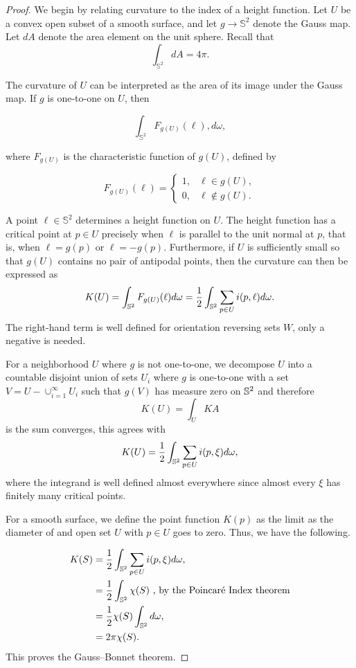 \begin{proof}

We begin by relating curvature to the index of a height function. Let $U$ be a convex open subset of a smooth surface, and let $g\to \mathbb{S}^2$ denote the Gauss map. Let $dA$ denote the area element on the unit sphere. Recall that
$$\int_{\mathbb{S}^2} dA = 4\pi.$$

The curvature of $U$ can be interpreted as the area of its image under the Gauss map. 
If $g$ is one-to-one on $U$, then

$$\int_{\mathbb{S}^2} F_{g(U)}(\ell),d\omega,$$


where $F_{g(U)}$ is the characteristic function of $g(U)$, defined by


$$F_{g(U)}(\ell)=
\begin{cases}
1, & \ell\in g(U),\\
0, & \ell\notin g(U).
\end{cases}$$


A point $\ell\in \mathbb{S}^2$ determines a height function on $U$. The height function has a critical point at $p\in U$ precisely when $\ell$ is parallel to the unit normal at $p$, that is, when $\ell=g(p)$ or $\ell=-g(p)$. Furthermore, if $U$ is sufficiently small so that $g(U)$ contains no pair of antipodal points, then
the curvature can then be expressed as 
$$K(U)=\int_{\mathbb{S}^2}F_{g(U)}(\ell)d\omega =\frac{1}{2}\int_{\mathbb{S}^2}\sum_{p\in U} i(p,\ell)d\omega.$$
The right-hand term is well defined for orientation reversing sets $W$, only a negative is needed.

For a neighborhood $U$ where $g$ is not one-to-one, we decompose $U$ into a countable
disjoint union of sets $U_i$ where $g$ is one-to-one with a set $V=U-\cup_{i=1}^\infty U_i$
such that $g(V)$ has measure zero on $\mathbb{S}^2$ and therefore
$$K(U)=\int_{U} KA$$ is the sum converges, this agrees with 
$$K(U)=\frac{1}{2}\int_{\mathbb{S}^2}\sum_{p\in U} i(p,\xi)d\omega,$$
where the integrand is well defined almost everywhere since almost every $\xi$
has finitely many critical points.

For a smooth surface, we define the point function $K(p)$ as the limit as the diameter of 
and open set $U$ with $p\in U$ goes to zero. Thus, we have the following.

\begin{align}
K(S) &=\frac{1}{2}\int_{\mathbb{S}^2}\sum_{p\in U} i(p,\xi)d\omega,  \\ \nonumber
       &=\frac{1}{2}\int_{\mathbb{S}^2}\chi(S) \text{ , by the Poincar\'e Index theorem}\\ \nonumber
       &=\frac{1}{2}\chi(S)\int_{\mathbb{S}^2}d\omega, \\ \nonumber
       &=2\pi\chi(S). \nonumber 
\end{align}
This proves the Gauss--Bonnet theorem.

\end{proof}


